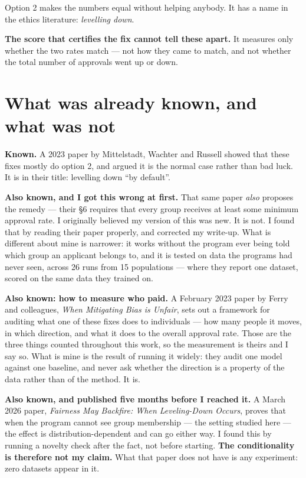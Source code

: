 \documentclass[11pt,a4paper]{article}
\newcommand{\jargon}[1]{\emph{#1}}
\begin{document}
Option 2 makes the numbers equal without helping anybody. It has a name in the ethics
literature: \jargon{levelling down}.

\textbf{The score that certifies the fix cannot tell these apart.} It measures only whether
the two rates match --- not how they came to match, and not whether the total number of
approvals went up or down.

\section{What was already known, and what was not}

\textbf{Known.} A 2023 paper by Mittelstadt, Wachter and Russell showed that these fixes
mostly do option 2, and argued it is the normal case rather than bad luck. It is in their
title: levelling down ``by default''.

\textbf{Also known, and I got this wrong at first.} That same paper \emph{also} proposes the
remedy --- their \S6 requires that every group receives at least some minimum approval rate.
I originally believed my version of this was new. It is not. I found that by reading their
paper properly, and corrected my write-up. What is different about mine is narrower: it
works without the program ever being told which group an applicant belongs to, and it is
tested on data the programs had never seen, across 26 runs from 15 populations --- where they report one
dataset, scored on the same data they trained on.

\textbf{Also known: how to measure who paid.} A February 2023 paper by Ferry and
colleagues, \emph{When Mitigating Bias is Unfair}, sets out a framework for auditing what
one of these fixes does to individuals --- how many people it moves, in which direction,
and what it does to the overall approval rate. Those are the three things counted
throughout this work, so the measurement is theirs and I say so. What is mine is the result
of running it widely: they audit one model against one baseline, and never ask whether the
direction is a property of the data rather than of the method. It is.

\textbf{Also known, and published five months before I reached it.} A March 2026 paper,
\emph{Fairness May Backfire: When Leveling-Down Occurs}, proves that when the program cannot
see group membership --- the setting studied here --- the effect is distribution-dependent
and can go either way. I found this by running a novelty check after the fact, not before
starting. \textbf{The conditionality is therefore not my claim.} What that paper does not
have is any experiment: zero datasets appear in it.
\end{document}
